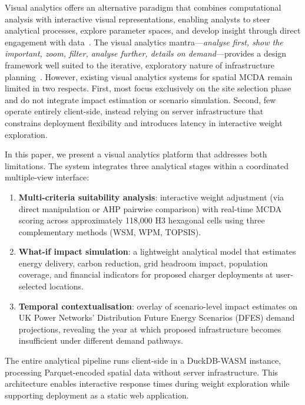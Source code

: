 Visual analytics offers an alternative paradigm that combines computational analysis with interactive visual representations, enabling analysts to steer analytical processes, explore parameter spaces, and develop insight through direct engagement with data~\cite{keim2008visual}. The visual analytics mantra---\emph{analyse first, show the important, zoom, filter, analyse further, details on demand}---provides a design framework well suited to the iterative, exploratory nature of infrastructure planning~\cite{shneiderman1996eyes}. However, existing visual analytics systems for spatial MCDA remain limited in two respects. First, most focus exclusively on the site selection phase and do not integrate impact estimation or scenario simulation. Second, few operate entirely client-side, instead relying on server infrastructure that constrains deployment flexibility and introduces latency in interactive weight exploration.

In this paper, we present a visual analytics platform that addresses both limitations. The system integrates three analytical stages within a coordinated multiple-view interface:

\begin{enumerate}[nosep]
    \item \textbf{Multi-criteria suitability analysis}: interactive weight adjustment (via direct manipulation or AHP pairwise comparison) with real-time MCDA scoring across approximately 118,000 H3 hexagonal cells using three complementary methods (WSM, WPM, TOPSIS).

    \item \textbf{What-if impact simulation}: a lightweight analytical model that estimates energy delivery, carbon reduction, grid headroom impact, population coverage, and financial indicators for proposed charger deployments at user-selected locations.

    \item \textbf{Temporal contextualisation}: overlay of scenario-level impact estimates on UK Power Networks' Distribution Future Energy Scenarios (DFES) demand projections, revealing the year at which proposed infrastructure becomes insufficient under different demand pathways.
\end{enumerate}

The entire analytical pipeline runs client-side in a DuckDB-WASM instance, processing Parquet-encoded spatial data without server infrastructure. This architecture enables interactive response times during weight exploration while supporting deployment as a static web application.

